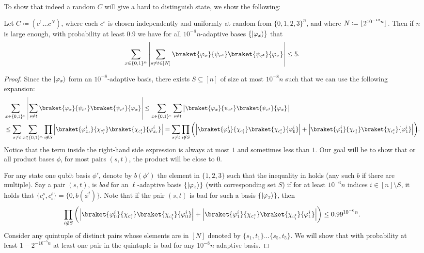 To show that indeed a random $C$ will give a hard to distinguish state, we show the following:
\begin{lemma}\label{lem:lower bound from concentration}
    Let $C\coloneq (c^1\ldots c^N)$, where each $c^s$ is chosen independently  and uniformly at random from  $\{0,1,2,3\}^n$, and where $N\coloneq {\left\lfloor \smash{2^{10^{-10}n}} \right\rfloor}$. Then if $n$ is large enough, with probability at least 0.9 we have for all $10^{-8}n$-adaptive bases $\{\lvert\varphi_x\rangle\}$ that
    \begin{align*}
        \sum_{x\in\{0,1\}^n}\abs{\sum_{s\neq t\in[N]}\braket{\phi_x}{\smash{\psi_{c^s}}}\braket{\smash{\psi_{c^t}}}{\phi_x}}\leq 5.
    \end{align*}
\end{lemma}
\begin{proof}
    Since the $\lvert\varphi_x\rangle$ form an $10^{-8}$-adaptive basis, there exists $S\subseteq[n]$ of size at most $10^{-8}n$ such that we can use the following expansion:
    \begin{align*}
        &\sum_{x\in\{0,1\}^n}\abs{\sum_{s\neq t}\braket{\phi_x}{\smash{\psi_{c^s}}}\braket{\smash{\psi_{c^t}}}{\phi_x}}\leq \sum_{x\in\{0,1\}^n}\sum_{s\neq t}\abs{\braket{\phi_x}{\smash{\psi_{c^s}}}\braket{\smash{\psi_{c^t}}}{\phi_x}}\\
        &\leq\sum_{s\neq t}\sum_{x\in\{0,1\}^n}\prod_{i\not\in S}\abs{\braket{\smash{\phi^i_{x_i}}}{\chi_{c^s_i}}\braket{\chi_{c^t_i}}{\smash{\phi^i_{x_i}}}}= \sum_{s\neq t}\prod_{i\not\in S}\pbra{\abs{\braket{\smash{\phi^i_{0}}}{\chi_{c^s_i}}\braket{\chi_{c^t_i}}{\smash{\phi^i_{0}}}}+\abs{\braket{\smash{\phi^i_{1}}}{\chi_{c^s_i}}\braket{\chi_{c^t_i}}{\smash{\phi^i_{1}}}}}.
    \end{align*}
    Notice that the term inside the right-hand side expression is always at most $1$ and sometimes less than $1$. Our goal will be to show that or all product bases $\phi$, for most pairs $(s,t)$, the product will be close to 0. 
    
    For any state one qubit basis $\phi'$, denote by $b(\phi')$ the element in $\{1,2,3\}$ such that the inequality in  holds (any such $b$ if there are multiple). Say a pair $(s,t)$, is \emph{bad} for an $\ell$-adaptive basis $\{\lvert\varphi_x\rangle\}$ (with corresponding set $S$) if for at least $10^{-6}n$ indices $i\in [n]\setminus S$, it holds that $\{c^s_i,c^t_i\} = \{0, b(\phi^i)\}$. Note that if the pair $(s,t)$ is bad for such a basis $\{\lvert\varphi_x\rangle\}$, then
    \[
        \prod_{i\not\in S}\pbra{\abs{\braket{\smash{\phi^i_{0}}}{\chi_{c^s_i}}\braket{\chi_{c^t_i}}{\smash{\phi^i_{0}}}}+\abs{\braket{\smash{\phi^i_{1}}}{\chi_{c^s_i}}\braket{\chi_{c^t_i}}{\smash{\phi^i_{1}}}}} \leq 0.99^{10^{-6}n}.
    \]
    Consider any quintuple of distinct pairs whose elements are in $[N]$ denoted by $\{s_1,t_1\}\ldots \{s_5,t_5\}$. We will show that with probability at least $1-2^{-10^{-5}n}$ at least one pair in the quintuple is bad for any $10^{-8}n$-adaptive basis.
    

\end{proof}

